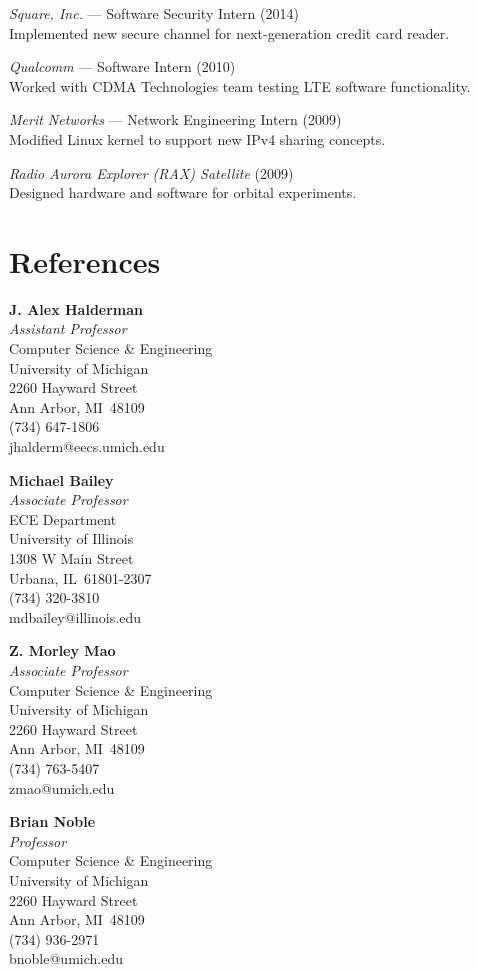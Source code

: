 \documentclass[margin,11pt]{res} %
\begin{document}
    \emph{Square, Inc.} --- Software Security Intern (2014) \\
    Implemented new secure channel for next-generation credit card reader.
    
    \emph{Qualcomm} --- Software Intern (2010) \\
    Worked with CDMA Technologies team testing LTE software functionality.
    
    \emph{Merit Networks} --- Network Engineering Intern (2009) \\
    Modified Linux kernel to support new IPv4 sharing concepts.

    \emph{Radio Aurora Explorer (RAX) Satellite} (2009) \\
    Designed hardware and software for orbital experiments.


\newpage

\vspace{6pt}

\section{\large References}
    
\textbf{J. Alex Halderman}\\
\emph{Assistant Professor}\smallskip\\
Computer Science \& Engineering\\
University of Michigan\\
2260 Hayward Street\\
Ann Arbor, MI \,48109\\
(734) 647-1806\\
jhalderm@eecs.umich.edu
\vspace{6pt}

\textbf{Michael Bailey}\\
    \emph{Associate Professor}\smallskip\\
    {ECE Department\\
    University of Illinois\\
    1308 W Main Street \\
    Urbana, IL \,61801-2307\\
     (734) 320-3810\\
    mdbailey@illinois.edu}
\vspace{6pt}

\textbf{Z. Morley Mao}\\
\emph{Associate Professor}\smallskip\\
Computer Science \& Engineering\\
University of Michigan\\
2260 Hayward Street\\
Ann Arbor, MI \,48109\\
(734) 763-5407\\
zmao@umich.edu
\vspace{6pt}

\textbf{Brian Noble}\\
\emph{Professor}\smallskip\\
Computer Science \& Engineering\\
University of Michigan\\
2260 Hayward Street\\
Ann Arbor, MI \,48109\\
(734) 936-2971\\
bnoble@umich.edu
\vspace{6pt}

\fi
\end{document}
